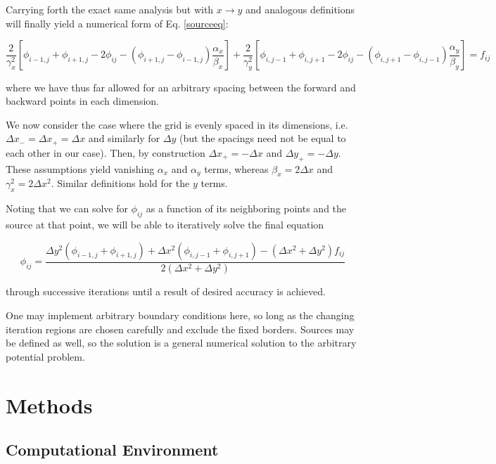 \documentclass[reprint, amsmath, amssymb, aps, floatfix]{revtex4-1}
\begin{document}
Carrying forth the exact same analysis but with $x\to y$ and analogous definitions will finally yield a numerical form of Eq. \eqref{sourceeq}: \begin{widetext}
	\begin{equation}
	\frac{2}{\gamma_x^2}\left[\phi_{i-1,j}+\phi_{i+1,j} - 2\phi_{ij} - \left(\phi_{i+1,j}-\phi_{i-1,j}\right)\frac{\alpha_x}{\beta_x}\right] + \frac{2}{\gamma_y^2}\left[\phi_{i,j-1}+\phi_{i,j+1} - 2\phi_{ij} - \left(\phi_{i,j+1}-\phi_{i,j-1}\right)\frac{\alpha_y}{\beta_y}\right] = f_{ij} \label{numsourceeq}
	\end{equation}
	\end{widetext} where we have thus far allowed for an arbitrary spacing between the forward and backward points in each dimension.

We now consider the case where the grid is evenly spaced in its dimensions, i.e. $\Delta x_-=\Delta x_+ = \Delta x$ and similarly for $\Delta y$ (but the spacings need not be equal to each other in our case). Then, by construction $\Delta x_+=-\Delta x$ and $\Delta y_+=-\Delta y$. These assumptions yield vanishing $\alpha_x$ and $\alpha_y$ terms, whereas $\beta_x=2\Delta x$ and $\gamma_x^2 = 2\Delta x^2$. Similar definitions hold for the $y$ terms. 

Noting that we can solve for $\phi_{ij}$ as a function of its neighboring points and the source at that point, we will be able to iteratively solve the final equation \begin{widetext}
\begin{equation}
\phi_{ij} = \frac{\Delta y^2(\phi_{i-1, j} + \phi_{i+1,j}) + \Delta x^2(\phi_{i, j-1}+\phi_{i, j+1}) - (\Delta x^2+\Delta y^2)f_{ij}}{2(\Delta x^2+\Delta y^2)} \label{jitereq}
\end{equation}
\end{widetext} through successive iterations until a result of desired accuracy is achieved.

One may implement arbitrary boundary conditions here, so long as the changing iteration regions are chosen carefully and exclude the fixed borders. Sources may be defined as well, so the solution is a general numerical solution to the arbitrary potential problem.



\section{Methods}

\subsection{Computational Environment}
\end{document}
